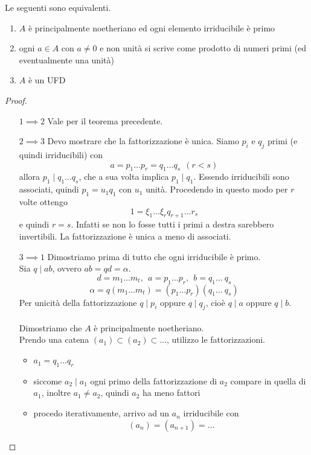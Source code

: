 	\label{lezione4}
\begin{teorema}
	Le seguenti sono equivalenti.
	\begin{enumerate}
		\item $A$ è principalmente noetheriano ed ogni elemento irriducibile è primo
		\item ogni $a \in A$ con $a\neq0$ e non unità si scrive come prodotto di numeri primi (ed eventualmente una unità)
		\item $A$ è un UFD
	\end{enumerate}
\end{teorema}
\begin{proof}\
	\begin{itemize}
		\item[$1 \implies 2$] Vale per il teorema precedente.
		\item[$2 \implies 3$] Devo mostrare che la fattorizzazione è unica. Siamo $p_i$ e $q_j$ primi (e quindi irriducibili) con
		\begin{equation*}
		a=p_1 \dots p_r = q_1 \dots q_s \ \ (r<s)
		\end{equation*}
		allora $p_1\mid q_1 \dots q_s$, che a sua volta implica $p_1\mid q_1$. Essendo irriducibili sono associati, quindi $p_1=u_1 q_1$ con $u_1$ unità. Procedendo in questo modo per $r$ volte ottengo
		\begin{equation*}
		1=\xi_1\dots\xi_r q_{r+1}\dots r_s
		\end{equation*}
		e quindi $r=s$. Infatti se non lo fosse tutti i primi a destra sarebbero invertibili. La fattorizzazione è unica a meno di associati.
		\item[$3 \implies 1$] Dimostriamo prima di tutto che ogni irriducibile è primo. \\ Sia $q\mid ab$, ovvero $ab=qd=\alpha$.
		\begin{equation*}
		d=m_1\dots m_t, \ \ a=p_1\dots p_r, \ \ b=q_1\dots \ q_s
		\end{equation*}
		\begin{equation*}
		\alpha = q (m_1\dots m_t)=(p_1\dots p_r)(q_1\dots \ q_s)
		\end{equation*}
		Per unicità della fattorizzazione $q\mid p_i$ oppure $q\mid q_j$, cioè $q\mid a$ oppure $q\mid b$. \\ \\
		Dimostriamo che $A$ è principalmente noetheriano. \\ Prendo una catena $(a_1)\subset(a_2)\subset\dots$, utilizzo le fattorizzazioni.
		\begin{itemize}
			\item $a_1=q_1\dots q_r$
			\item siccome $a_2 \mid a_1$ ogni primo della fattorizzazione di $a_2$ compare in quella di $a_1$, inoltre $a_1 \neq a_2$, quindi $a_2$ ha meno fattori
			\item procedo iterativamente, arrivo ad un $a_n$ irriducibile con 
			\begin{equation*}
			(a_n)=(a_{n+1})=\dots
			\end{equation*}
		\end{itemize}
	\end{itemize}
\end{proof}

